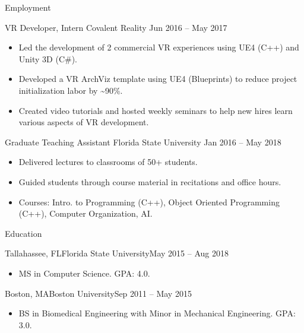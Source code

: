 \documentclass[]{mcdowellcv}
\begin{document}
\begin{cvsection}{Employment}
		\begin{cvsubsection} {VR Developer, Intern} {Covalent Reality} {Jun 2016 -- May 2017}
			\begin{itemize}
				\item Led the development of 2 commercial VR experiences using UE4 (C++) and Unity 3D (C\#).
				\item Developed a VR ArchViz template using UE4 (Blueprints) to reduce project initialization labor by \~{}90\%.
				\item Created video tutorials and hosted weekly seminars to help new hires learn various aspects of VR development.
			\end{itemize}
		\end{cvsubsection}
		
		\begin{cvsubsection} {Graduate Teaching Assistant} {Florida State University} {Jan 2016 -- May 2018}
			\begin{itemize}
				\item Delivered lectures to classrooms of 50+ students.
				\item Guided students through course material in recitations and office hours.
				\item Courses: Intro. to Programming (C++), Object Oriented Programming (C++), Computer Organization, AI.
			\end{itemize}
		\end{cvsubsection}
	\end{cvsection}
	
	\begin{cvsection}{Education}
		\begin{cvsubsection}{Tallahassee, FL}{Florida State University}{May 2015 -- Aug 2018}
			\begin{itemize}
				\item MS in Computer Science. GPA: 4.0.
			\end{itemize}
		\end{cvsubsection}
		
		\begin{cvsubsection}{Boston, MA}{Boston University}{Sep 2011 -- May 2015}
			\begin{itemize}
				\item BS in Biomedical Engineering with Minor in Mechanical Engineering. GPA: 3.0.
			\end{itemize}
		\end{cvsubsection}
	\end{cvsection}
\end{document}
